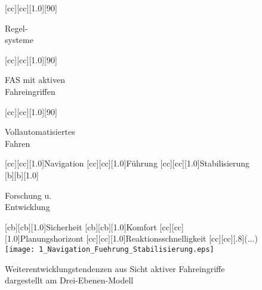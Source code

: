 %
\begin{figure}[t]
	[cc][cc][1.0][90]{\parbox[c]{7cm}{\begin{center}Regel- \\ systeme \end{center}}}
		[cc][cc][1.0][90]{\parbox[c]{7cm}{\begin{center} FAS mit aktiven \\ Fahreingriffen\end{center}}}
	 [cc][cc][1.0][90]{\parbox[c]{7cm}{\begin{center} Vollautomatisiertes \\ Fahren \end{center}}}
	[cc][cc][1.0]{Navigation}
	[cc][cc][1.0]{Führung}
	[cc][cc][1.0]{Stabilisierung}
	[b][1.0]{\parbox[c]{10cm}{\begin{center} Forschung u.\\ Entwicklung \end{center}}}
	[cb][cb][1.0]{Sicherheit}
	[cb][cb][1.0]{Komfort}
	[cc][cc][1.0]{Planungshorizont}
	[cc][cc][1.0]{Reaktionsschnelligkeit}
	[cc][cc][.8]{($\ldots$)}
	\centering
	\texttt{[image: 1\_Navigation\_Fuehrung\_Stabilisierung.eps]}
	\caption[Weiterentwicklungstendenzen aus Sicht aktiver Fahreingriffe]{Weiterentwicklungstendenzen aus Sicht aktiver Fahreingriffe dargestellt am Drei-Ebenen-Modell \cite{donges1982aas}}%
	\label{fig:Navigation_Fuehrung_Stabilisierung}
\end{figure}


